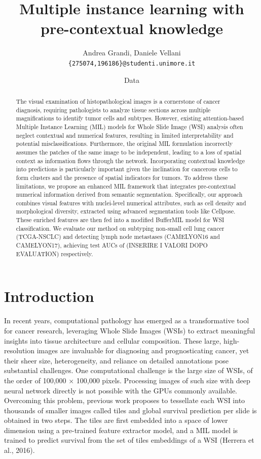 \documentclass[10pt,twocolumn]{article}
\title{\textbf{Multiple instance learning with pre-contextual knowledge}}
\author{Andrea Grandi, Daniele Vellani \\
\texttt{\{275074,196186\}@studenti.unimore.it}}
\date{Data}
\begin{document}
\maketitle

\begin{abstract}
\noindent 
The visual examination of histopathological images is a cornerstone of cancer diagnosis, requiring pathologists to analyze tissue sections across multiple magnifications to identify tumor cells and subtypes. However, existing attention-based Multiple Instance Learning (MIL) models for Whole Slide Image (WSI) analysis often neglect contextual and numerical features, resulting in limited interpretability and potential misclassifications. Furthermore, the original MIL formulation incorrectly assumes the patches of the same image to be independent, leading to a loss of spatial context as information flows through the network. Incorporating contextual knowledge into predictions is particularly important given the inclination for cancerous cells to form clusters and the presence of spatial indicators for tumors. To address these limitations, we propose an enhanced MIL framework that integrates pre-contextual numerical information derived from semantic segmentation. Specifically, our approach combines visual features with nuclei-level numerical attributes, such as cell density and morphological diversity, extracted using advanced segmentation tools like Cellpose. These enriched features are then fed into a modified BufferMIL model for WSI classification. We evaluate our method on subtyping non-small cell lung cancer (TCGA-NSCLC) and detecting lymph node metastases (CAMELYON16 and CAMELYON17), achieving test AUCs of (INSERIRE I VALORI DOPO EVALUATION) respectively. 

\end{abstract}

\section{Introduction}
In recent years, computational pathology has emerged as a transformative tool for cancer research, leveraging Whole Slide Images (WSIs) to extract meaningful insights into tissue architecture and cellular composition. These large, high-resolution images are invaluable for diagnosing and prognosticating cancer, yet their sheer size, heterogeneity, and reliance on detailed annotations pose substantial challenges. One computational challenge is the large size of WSIs, of the order of 100,000 $\times$ 100,000 pixels. Processing images of such size with deep neural network directly is not possible with the GPUs commonly available. Overcoming this problem, previous work proposes to tessellate each WSI into thousands of smaller images called tiles and global survival prediction per slide is obtained in two steps. The tiles are first embedded into a space of lower dimension using a pre-trained feature extractor model, and a MIL model is trained to predict survival from the set of tiles embeddings of a WSI (Herrera et al., 2016)\cite{8507932}. 
\end{document}
